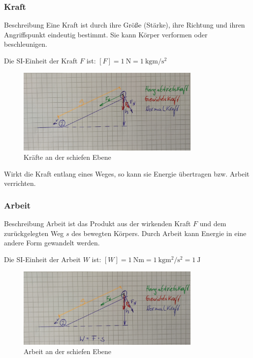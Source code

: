 \documentclass[12pt,oneside]{scrartcl}
\begin{document}
\frame
{
  \frametitle{Kraft}
\begin{block}{Beschreibung}
Eine Kraft ist durch ihre Größe (Stärke), ihre Richtung und ihren Angriffspunkt eindeutig bestimmt. Sie kann Körper verformen oder beschleunigen.
\end{block}
Die SI-Einheit der Kraft $F$ ist:
$[F]=\SI{1}{\newton}=\SI{1}{\kilo\gram\meter\per\square\second}$
      \begin{figure}
	  \includegraphics[width=0.8\textwidth]{Kraft}
	  \vspace{-3mm}
	  \caption{Kräfte an der schiefen Ebene}
   \end{figure}
     Wirkt die Kraft entlang eines Weges, so kann sie Energie übertragen bzw. Arbeit verrichten.
}

\frame
{
  \frametitle{Arbeit}
\begin{block}{Beschreibung}
Arbeit ist das Produkt aus der wirkenden Kraft $F$ und dem zurückgelegten Weg $s$ des bewegten Körpers. Durch Arbeit kann Energie in eine andere Form gewandelt werden.
\end{block}
Die SI-Einheit der Arbeit $W$ ist:
$[W]=\SI{1}{\newton\meter}=\SI{1}{\kilo\gram\square\meter\per\square\second}=\SI{1}{\joule}$
      \begin{figure}
	  \includegraphics[width=0.8\textwidth]{Arbeit_1}
	  \vspace{-3mm}
	  \caption{Arbeit an der schiefen Ebene}
   \end{figure}
}
\end{document}
